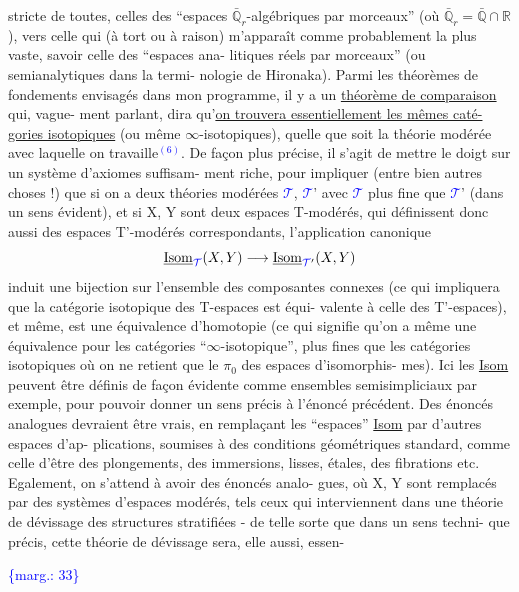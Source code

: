 \documentclass[11pt]{article}
\newcommand{\scanpage}[1]{\par\bigskip\noindent{\small\sffamily[scan #1]}\par}
\newcommand{\mspage}[1]{{\small\sffamily[p.\,#1]}}
\newcommand{\hand}[1]{\textcolor{blue}{#1}}
\newcommand{\margin}[1]{\textcolor{blue}{\{\textsf{marg.:} #1\}}}
\newcommand{\uline}[1]{\underline{#1}}
\begin{document}
stricte de toutes, celles des ``espaces $\bar{\mathbb{Q}}_r$-algébriques par morceaux''
(où $\bar{\mathbb{Q}}_r = \bar{\mathbb{Q}} \cap \mathbb{R}$), vers celle qui (à tort ou à raison) m'apparaît
comme probablement la plus vaste, savoir celle des ``espaces ana-%
litiques réels par morceaux'' (ou semianalytiques dans la termi-%
nologie de Hironaka). Parmi les théorèmes de fondements envisagés
dans mon programme, il y a un \uline{théorème de comparaison} qui, vague-%
ment parlant, dira qu'\uline{on trouvera essentiellement les mêmes caté-%
gories isotopiques} (ou même $\infty$-isotopiques), quelle que soit la
théorie modérée avec laquelle on travaille\hand{$^{(6)}$}. De façon plus précise,
il s'agit de mettre le doigt sur un système d'axiomes suffisam-%
ment riche, pour impliquer (entre bien autres choses !) que si on
a deux théories modérées \hand{$\mathcal{T}$}, \hand{$\mathcal{T}$}' avec \hand{$\mathcal{T}$} plus fine que \hand{$\mathcal{T}$}' (dans
un sens évident), et si X, Y sont deux espaces T-modérés, qui
définissent donc aussi des espaces T'-modérés correspondants,
l'application canonique
\[ \underline{\mathrm{Isom}}_{\hand{\mathcal{T}}}(X,Y) \longrightarrow \underline{\mathrm{Isom}}_{\hand{\mathcal{T}}'}(X,Y) \]
induit une bijection sur l'ensemble des composantes connexes (ce
qui impliquera que la catégorie isotopique des T-espaces est équi-%
valente à celle des T'-espaces), et même, est une équivalence
d'homotopie (ce qui signifie qu'on a même une équivalence pour
les catégories ``$\infty$-isotopique'', plus fines que les catégories
isotopiques où on ne retient que le $\pi_0$ des espaces d'isomorphis-%
mes). Ici les \uline{Isom} peuvent être définis de façon évidente comme
ensembles semisimpliciaux par exemple, pour pouvoir donner un sens
précis à l'énoncé précédent. Des énoncés analogues devraient être
vrais, en remplaçant les ``espaces'' \uline{Isom} par d'autres espaces d'ap-%
plications, soumises à des conditions géométriques standard, comme
celle d'être des plongements, des immersions, lisses, étales, des
fibrations etc. Egalement, on s'attend à avoir des énoncés analo-%
gues, où X, Y sont remplacés par des systèmes d'espaces modérés,
tels ceux qui interviennent dans une théorie de dévissage des
structures stratifiées - de telle sorte que dans un sens techni-%
que précis, cette théorie de dévissage sera, elle aussi, essen-%

\margin{33}

\clearpage
\scanpage{119/34}
\mspage{32}
\end{document}
